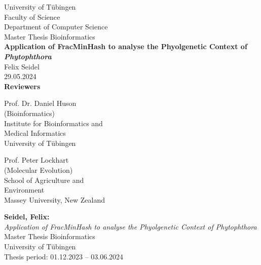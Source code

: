 \documentclass[twoside,12pt,a4paper]{report}
\begin{document}
 
\begin{titlepage}
 \begin{center}
  {\LARGE University of T\"ubingen}\\
  {\large Faculty of Science \\
 Department of Computer Science\\[4cm]}
  {\huge Master Thesis Bioinformatics\\[2cm]}
  {\Large\bf Application of FracMinHash to analyse the Phyolgenetic Context of \textit{Phytophthora}\\[1.5cm]}
 {\large Felix Seidel}\\[0.5cm]
  29.05.2024\\[3cm]
{\small\bf Reviewers}\\[0.5cm]
  \parbox{7cm}{\begin{center}{\large Prof. Dr. Daniel Huson}\\
   (Bioinformatics)\\
  {\footnotesize Institute for Bioinformatics and\\ Medical Informatics\\
	University of T\"ubingen}\end{center}}\hfill\parbox{7cm}{\begin{center}
  {\large Prof. Peter Lockhart}\\
  (Molecular Evolution)\\
  {\footnotesize School of Agriculture and\\ Environment\\
	Massey University, New Zealand}\end{center}
 }
  \end{center}
\end{titlepage}


\thispagestyle{empty}
\vspace*{\fill}
\begin{minipage}{11.2cm}
\textbf{Seidel, Felix:}\\
\emph{Application of FracMinHash to analyse the Phyolgenetic Context of Phytophthora}\\ Master Thesis Bioinformatics\\
University of T\"ubingen\\
Thesis period: 01.12.2023 -- 03.06.2024
\end{minipage}
\newpage
\end{document}
